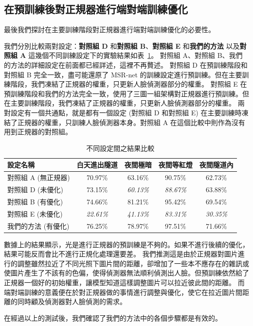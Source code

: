 \subsection{在預訓練後對正規器進行端對端訓練優化}

最後我們探討在主要訓練階段對正規器進行端對端訓練優化的必要性。

我們分別比較兩對設定：\textbf{對照組 D} 和\textbf{對照組 B}、\textbf{對照組 E} 和\textbf{我們的方法} 以及\textbf{對照組 A} 這幾個不同訓練設定下的實驗結果如表~\ref{table:optimize_compare}。
對照組 A、對照組 B、我們的方法的詳細設定在前面都已經詳述，這裡不再贅述。
對照組 D 在預訓練階段和對照組 B 完全一致，盡可能還原了 MSR-net 的訓練設定進行預訓練。但在主要訓練階段，我們凍結了正規器的權重，只更新人臉偵測器部分的權重。
對照組 E 在預訓練階段和我們的方法完全一致，使用了三圖一組架構對正規器進行預訓練。但在主要訓練階段，我們凍結了正規器的權重，只更新人臉偵測器部分的權重。
兩對設定有一個共通點，就是都有一個設定 (對照組 D 和對照組 E) 在主要訓練時凍結了正規器的權重，只訓練人臉偵測器本身。對照組 A 在這個比較中則作為沒有用到正規器的對照組。

\begin{table}[ht]
    \caption{不同設定間之結果比較}
    \centering
    \begin{tabular}{l c c c c}
        \hline
        設定名稱 & 白天進出隧道 & 夜間極暗 & 夜間等紅燈 & 夜間隧道內 \\
        \hline
        對照組 A (無正規器) & 70.97\% & 63.16\% & 90.75\% & 62.73\% \\
        \hline
        對照組 D (未優化) & 73.15\% & \emph{60.13\%} & \emph{88.67\%} & 63.88\% \\
        對照組 B (有優化) & 74.66\% & 81.21\% & 95.42\% & 69.54\% \\
        \hline
        對照組 E (未優化) & \emph{22.61\%} & \emph{41.13\%} & \emph{83.31\%} & \emph{30.35\%} \\
        我們的方法 (有優化) & 76.25\% & 78.97\% & 97.51\% & 71.66\% \\
        \hline
    \end{tabular}
    \label{table:optimize_compare}
\end{table}

數據上的結果顯示，光是進行正規器的預訓練是不夠的。如果不進行後續的優化，結果可能反而會比不進行正規化處理還要差。
我們推測這是由於正規器對圖片進行的調整雖然拉近了不同光照下圖片間的距離，卻增加了一些本不應存在的雜訊或使圖片產生了不該有的色偏，使得偵測器無法順利偵測出人臉。但預訓練依然給了正規器一個好的初始權重，讓模型知道這樣調整圖片可以拉近彼此間的距離。
而端對端訓練的意義便在於對正規器做的事情進行調整與優化，使它在拉近圖片間距離的同時顧及偵測器對人臉偵測的需求。

在經過以上的測試後，我們確認了我們的方法中的各個步驟都是有效的。